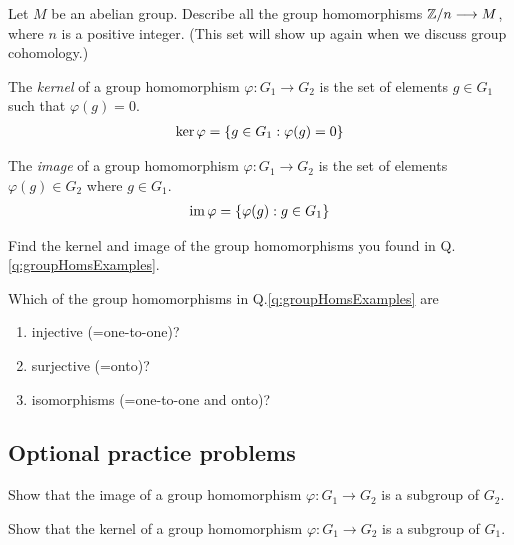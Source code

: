 \begin{qbox}
  Let $M$ be an abelian group. Describe all the group homomorphisms $ \mathbb{Z}/n \longrightarrow M$, where $n$ is a positive integer.
  (This set will show up again when we discuss group cohomology.)
\end{qbox}

\begin{definition}
  The \emph{kernel} of a group homomorphism  $\varphi: G_1 \longrightarrow G_2$ is the set of elements $g \in G_1$ such that $\varphi(g) = 0$.
  \begin{align*}
    \ker \varphi = \left\{ g \in G_1 : \varphi(g) = 0\right\}
  \end{align*}
\end{definition}

\begin{definition}
  The \emph{image} of a group homomorphism  $\varphi: G_1 \longrightarrow G_2$ is the set of elements $\varphi(g) \in G_2$ where $g \in G_1$.
  \begin{align*}
    \operatorname{im} \varphi = \left\{ \varphi(g) : g \in G_1\right\}
  \end{align*}
\end{definition}


\begin{qbox}
  Find the kernel and image of the group homomorphisms you found in Q.\ref{q:groupHomsExamples}.
\end{qbox}

\begin{qbox}
  Which of the group homomorphisms in Q.\ref{q:groupHomsExamples} are
  \begin{enumerate}
    \item injective (=one-to-one)?
    \item surjective (=onto)?
    \item isomorphisms (=one-to-one and onto)?
  \end{enumerate}
\end{qbox}

\subsection*{Optional practice problems}

\begin{qbox}
  Show that the image of a group homomorphism  $\varphi: G_1 \longrightarrow G_2$ is a subgroup of $G_2$.
\end{qbox}

\begin{qbox}
  Show that the kernel of a group homomorphism  $\varphi: G_1 \longrightarrow G_2$ is a subgroup of $G_1$.
\end{qbox}

